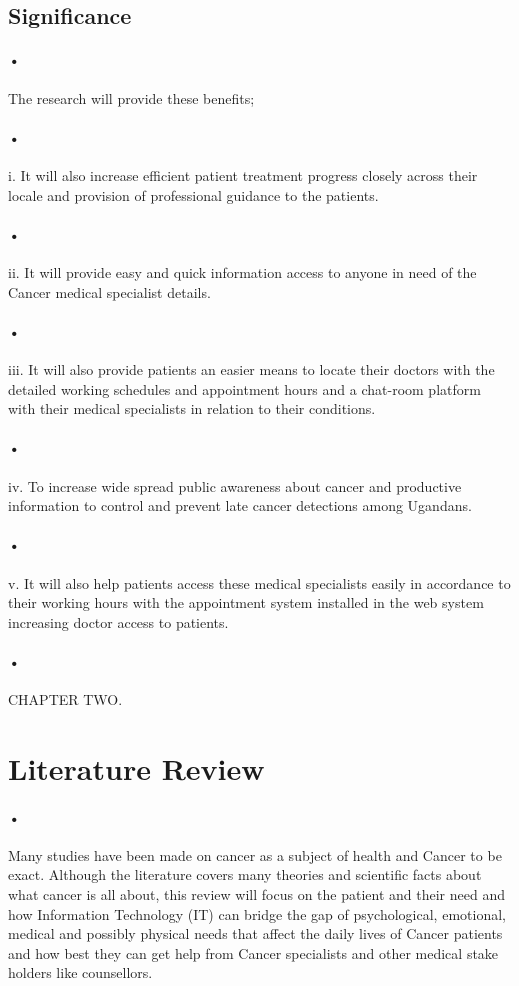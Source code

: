 \documentclass[12pt]{article}
\begin{document}
\subsection{Significance}
\paragraph{•}The research will provide these benefits;
\paragraph{•}i. It will also increase efficient patient treatment progress closely across their locale and provision of professional guidance to the patients.
\paragraph{•}ii. It will provide easy and quick information access to anyone in need of the Cancer medical specialist details.
\paragraph{•}iii. It will also provide patients an easier means to locate their doctors with the detailed working schedules and appointment hours and a chat-room platform with their medical specialists in relation to their conditions.
\paragraph{•}iv. To increase wide spread public awareness about cancer and productive information to control and prevent late cancer detections among Ugandans.
\paragraph{•}v. It will also help patients access these medical specialists easily in accordance to their working hours with the appointment system installed in the web system increasing doctor access to patients.

\paragraph{•}CHAPTER TWO.

\section{Literature Review}
\paragraph{•} Many studies have been made on cancer as a subject of health and Cancer to be exact. Although the literature covers many theories and scientific facts about what cancer is all about, this review will focus on the patient and their need and how Information Technology (IT) can bridge the gap of psychological, emotional, medical and possibly physical needs that affect the daily lives of Cancer patients and how best they can get help from Cancer specialists and other medical stake holders like counsellors. 
\end{document}
